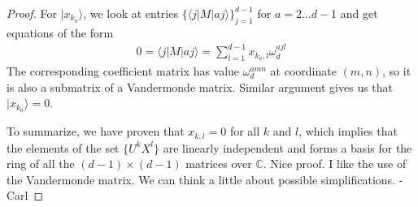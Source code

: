 \documentclass[11pt,letterpaper]{article}
\newcommand{\ket}[1]{|#1\rangle}
\newcommand{\bra}[1]{\langle#1|}
\newcommand{\C}{\mathbb{C}}
\newcommand{\1}{\mathbb{1}}
\def\carl#1{{\color{blue} #1 -Carl}}
\theoremstyle{definition}
\begin{document}
\begin{proof}
For $\ket{x_{k_a}}$, we look at entries $\{\bra{j}M\ket{aj}\}_{j=1}^{d-1}$ for $a = 2 \dots d-1$ and get equations
of the form
\begin{align}
	0 = \bra{j}M\ket{aj} = \sum_{l=1}^{d-1} x_{k_a, l} \omega_d^{ajl} 
\end{align}
The corresponding coefficient matrix has value $\omega_d^{amn}$ at coordinate $(m,n)$,
so it is also a submatrix of a Vandermonde matrix. Similar argument gives us that $\ket{x_{k_a}} = 0$.

To summarize, we have proven that $x_{k,l} = 0$ for all $k$ and $l$, which implies that the elements of the set
$\{ U^k X^l \}$ are linearly independent and forms a basis for the ring of all the $(d-1)\times(d-1)$ matrices over $\C$.
\carl{Nice proof.  I like the use of the Vandermonde matrix.  We can think a little about possible simplifications.}
\end{proof}
\end{document}
